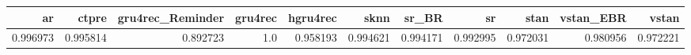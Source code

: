 \begin{tabular}{rrrrrrrrrrr}
\toprule
       ar &     ctpre &  gru4rec\_Reminder &  gru4rec &  hgru4rec &      sknn &     sr\_BR &        sr &      stan &  vstan\_EBR &     vstan \\
\midrule
 0.996973 &  0.995814 &          0.892723 &      1.0 &  0.958193 &  0.994621 &  0.994171 &  0.992995 &  0.972031 &   0.980956 &  0.972221 \\
\bottomrule
\end{tabular}
